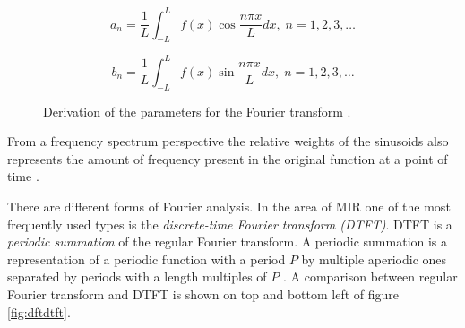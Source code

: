 \begin{figure}[H]
    \begin{equation}
        a_n = \frac{1}{L}\int_{-L}^{L}f(x)\cos\frac{n{\pi}x}{L}dx,\; n = 1,2,3,\dots
    \end{equation}

    \begin{equation}
        b_n = \frac{1}{L}\int_{-L}^{L}f(x)\sin\frac{n{\pi}x}{L}dx,\; n = 1,2,3,\dots
    \end{equation}
    \caption[Fourier series parameter derivation]{Derivation of the parameters for the Fourier transform \cite{fourierequations}.}
\end{figure}



From a frequency spectrum perspective the relative weights of the sinusoids also
represents the amount of frequency present in the original function at a point
of time \cite{wiki:fourier}. 

There are different forms of Fourier analysis. In the area of MIR one of the
most frequently used types is the \textit{discrete-time Fourier transform
(DTFT)}. DTFT is a \textit{periodic summation} of the regular Fourier transform.
A periodic summation is a representation of a periodic function with a period
$P$ by multiple aperiodic ones separated by periods with a length multiples of
$P$ \cite{wiki:periodicsummation}. A comparison between regular Fourier
transform and DTFT is shown on top and bottom left of figure \ref{fig:dftdtft}.

